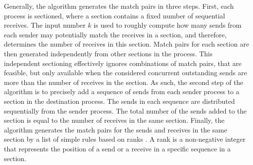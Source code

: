 Generally, the algorithm generates the match pairs in three steps. 
First, each process is sectioned, where a section contains a fixed number of sequential receives. The input number $k$ is used to roughly compute how many sends from each sender may potentially match the receives in a section, and therefore, determines the number of receives in this section. 
Match pairs for each section are then generated independently from other sections in the process. This independent sectioning effectively ignores combinations of match pairs, that are feasible, but only available when the considered concurrent outstanding sends are more than the number of receives in the section. As such, the second step of the algorithm is to precisely add a sequence of sends from each sender process to a section in the destination process. The sends in each sequence are distributed sequentially from the sender process. The total number of the sends added to the section is equal to the number of receives in the same section. Finally, the algorithm generates the match pairs for the sends and receives in the same section by a list of simple rules based on ranks \cite{DBLP:conf/kbse/HuangMM13}. A rank is a non-negative integer that represents the position of a send or a receive in a specific sequence in a section.




